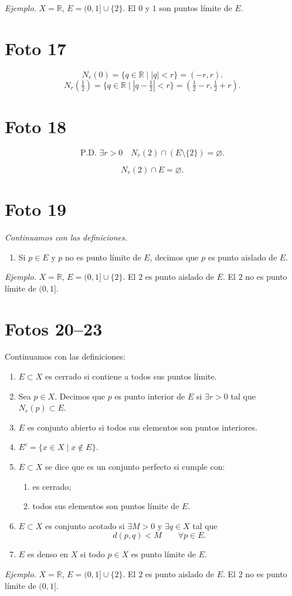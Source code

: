 \documentclass[12pt]{article}
\begin{document}
\textit{Ejemplo.} $X=\mathbb R$, $E=(0,1]\cup\{2\}$.
El $0$ y $1$ son puntos límite de $E$.

\section*{Foto 17}

\[
N_r(0)=\{q\in\mathbb R\mid |q|<r\}=(-r,r).
\]
\[
N_r\!\left(\tfrac12\right)=\{q\in\mathbb R\mid |q-\tfrac12|<r\}=
\left(\tfrac12-r,\tfrac12+r\right).
\]

\section*{Foto 18}

\[
\text{P.D. } \exists r>0\quad N_r(2)\cap (E\setminus\{2\})=\varnothing.
\]

\[
N_r(2)\cap E=\varnothing.
\]

\section*{Foto 19}

\textit{Continuamos con las definiciones.}

\begin{enumerate}[label=\alph*)]
    \item Si $p\in E$ y $p$ no es punto límite de $E$, decimos que $p$ es punto aislado de $E$.
\end{enumerate}

\textit{Ejemplo.} $X=\mathbb R$, $E=(0,1]\cup\{2\}$.
El $2$ es punto aislado de $E$.
El $2$ no es punto límite de $(0,1]$.

\section*{Fotos 20--23}

Continuamos con las definiciones:

\begin{enumerate}[label=\alph*)]
    \item $E\subset X$ es cerrado si contiene a todos sus puntos límite.
    \item Sea $p\in X$. Decimos que $p$ es punto interior de $E$ si $\exists r>0$ tal que $N_r(p)\subset E$.
    \item $E$ es conjunto abierto si todos sus elementos son puntos interiores.
    \item $E^c=\{x\in X\mid x\notin E\}$.
    \item $E\subset X$ se dice que es un conjunto perfecto si cumple con:
    \begin{enumerate}[label=\arabic*)]
        \item es cerrado;
        \item todos sus elementos son puntos límite de $E$.
    \end{enumerate}
    \item $E\subset X$ es conjunto acotado si $\exists M>0$ y $\exists q\in X$ tal que
    \[
    d(p,q)<M\qquad \forall p\in E.
    \]
    \item $E$ es denso en $X$ si todo $p\in X$ es punto límite de $E$.
\end{enumerate}

\textit{Ejemplo.} $X=\mathbb R$, $E=(0,1]\cup\{2\}$.
El $2$ es punto aislado de $E$.
El $2$ no es punto límite de $(0,1]$.
\end{document}
